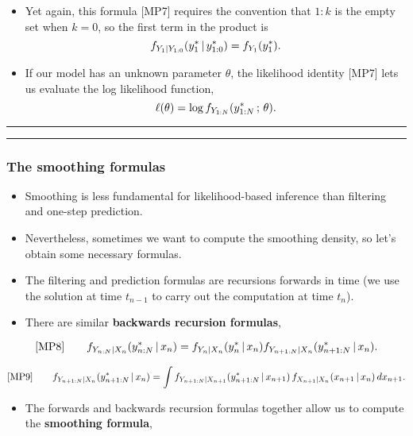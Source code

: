 \documentclass[]{article}
\providecommand{\tightlist}{%
  \setlength{\itemsep}{0pt}\setlength{\parskip}{0pt}}
\begin{document}
\begin{itemize}
\item
  Yet again, this formula {[}MP7{]} requires the convention that \(1:k\)
  is the empty set when \(k=0\), so the first term in the product is
  \[f_{Y_{1}|Y_{1:0}}(y_1^*{\, | \,} y_{1:0}^*) = 
  f_{Y_{1}}(y_1^*).\]
\item
  If our model has an unknown parameter \(\theta\), the likelihood
  identity {[}MP7{]} lets us evaluate the log likelihood function,
  \[\ell(\theta)=\log f_{Y_{1:N}}(y_{1:N}^*\, ; \,\theta).\]
\end{itemize}

\begin{center}\rule{0.5\linewidth}{\linethickness}\end{center}

\begin{center}\rule{0.5\linewidth}{\linethickness}\end{center}

\subsubsection{The smoothing formulas}\label{the-smoothing-formulas}

\begin{itemize}
\item
  Smoothing is less fundamental for likelihood-based inference than
  filtering and one-step prediction.
\item
  Nevertheless, sometimes we want to compute the smoothing density, so
  let's obtain some necessary formulas.
\item
  The filtering and prediction formulas are recursions forwards in time
  (we use the solution at time \(t_{n-1}\) to carry out the computation
  at time \(t_{n}\)).
\item
  There are similar \textbf{backwards recursion formulas},
\end{itemize}

$$\text{[MP8]}
\quad\quad f_{Y_{n:N}|X_{n}}(y_{n:N}^*{\, | \,} x_n)= f_{Y_n|X_n}(y_n^*{\, | \,} x_n) f_{Y_{n+1:N}|X_{n}}(y_{n+1:N}^*{\, | \,} x_n).$$

$$\text{[MP9]}
\quad\quad \displaystyle f_{Y_{n+1:N}|X_{n}}(y_{n+1:N}^*{\, | \,} x_n) = \int f_{Y_{n+1:N}|X_{n+1}}(y_{n+1:N}^*{\, | \,} x_{n+1}) \, f_{X_{n+1}|X_n}(x_{n+1}{\, | \,} x_n)\, dx_{n+1}.$$

\begin{itemize}
\tightlist
\item
  The forwards and backwards recursion formulas together allow us to
  compute the \textbf{smoothing formula},
\end{itemize}
\end{document}
